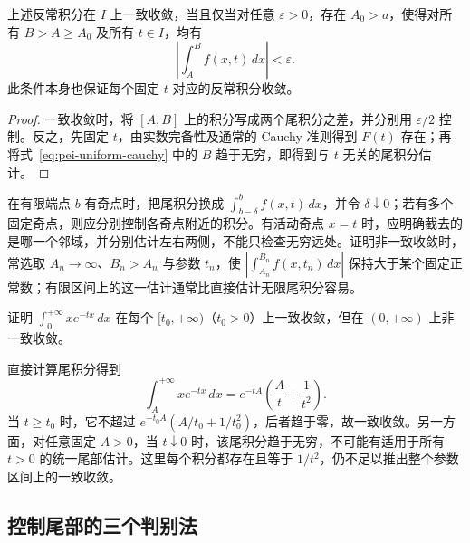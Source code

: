 \begin{theorem}
\label{thm:pei-improper-uniform-cauchy}
上述反常积分在 $I$ 上一致收敛，当且仅当对任意 $\varepsilon>0$，存在 $A_0>a$，使得对所有 $B>A\ge A_0$ 及所有 $t\in I$，均有
\begin{equation}
\label{eq:pei-uniform-cauchy}
\left|\int_A^B f(x,t)\,dx\right|<\varepsilon.
\end{equation}
此条件本身也保证每个固定 $t$ 对应的反常积分收敛。
\end{theorem}
\begin{proof}
一致收敛时，将 $[A,B]$ 上的积分写成两个尾积分之差，并分别用 $\varepsilon/2$ 控制。反之，先固定 $t$，由实数完备性及通常的 Cauchy 准则得到 $F(t)$ 存在；再将式~\eqref{eq:pei-uniform-cauchy} 中的 $B$ 趋于无穷，即得到与 $t$ 无关的尾积分估计。
\end{proof}

在有限端点 $b$ 有奇点时，把尾积分换成 $\int_{b-\delta}^b f(x,t)\,dx$，并令 $\delta\downarrow0$；若有多个固定奇点，则应分别控制各奇点附近的积分。有活动奇点 $x=t$ 时，应明确截去的是哪一个邻域，并分别估计左右两侧，不能只检查无穷远处。证明非一致收敛时，常选取 $A_n\to\infty$、$B_n>A_n$ 与参数 $t_n$，使 $|\int_{A_n}^{B_n}f(x,t_n)\,dx|$ 保持大于某个固定正常数；有限区间上的这一估计通常比直接估计无限尾积分容易。

\begin{example}
\label{ex:pei-nonuniform-exponential}
证明 $\int_0^{+\infty}xe^{-tx}\,dx$ 在每个 $[t_0,+\infty)$（$t_0>0$）上一致收敛，但在 $(0,+\infty)$ 上非一致收敛。
\end{example}
\begin{solve}
直接计算尾积分得到
\[
\int_A^{+\infty}xe^{-tx}\,dx
=e^{-tA}\left(\frac At+\frac1{t^2}\right).
\]
当 $t\ge t_0$ 时，它不超过 $e^{-t_0A}(A/t_0+1/t_0^2)$，后者趋于零，故一致收敛。另一方面，对任意固定 $A>0$，当 $t\downarrow0$ 时，该尾积分趋于无穷，不可能有适用于所有 $t>0$ 的统一尾部估计。这里每个积分都存在且等于 $1/t^2$，仍不足以推出整个参数区间上的一致收敛。
\end{solve}

\subsection{控制尾部的三个判别法}

